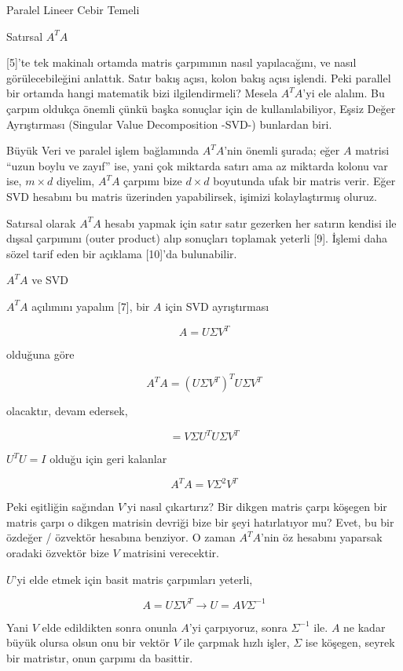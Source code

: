 \documentclass[12pt,fleqn]{article}\usepackage{../../common}
\begin{document}
Paralel Lineer Cebir Temeli

Satırsal $A^TA$

[5]'te tek makinalı ortamda matris çarpımının nasıl yapılacağını, ve nasıl
görülecebileğini anlattık. Satır bakış açısı, kolon bakış açısı işlendi. Peki
parallel bir ortamda hangi matematik bizi ilgilendirmeli? Mesela $A^TA$'yi ele
alalım. Bu çarpım oldukça önemli çünkü başka sonuçlar için de kullanılabiliyor,
Eşsiz Değer Ayrıştırması (Singular Value Decomposition -SVD-) bunlardan biri.

Büyük Veri ve paralel işlem bağlamında $A^TA$'nin önemli şurada; eğer $A$
matrisi ``uzun boylu ve zayıf'' ise, yani çok miktarda satırı ama az miktarda
kolonu var ise, $m \times d$ diyelim, $A^TA$ çarpımı bize $d \times d$ boyutunda
ufak bir matris verir. Eğer SVD hesabını bu matris üzerinden yapabilirsek,
işimizi kolaylaştırmış oluruz. 

Satırsal olarak $A^TA$ hesabı yapmak için satır satır gezerken her satırın
kendisi ile dışsal çarpımını (outer product) alıp sonuçları toplamak yeterli
[9]. İşlemi daha sözel tarif eden bir açıklama [10]'da bulunabilir.

$A^TA$ ve SVD

$A^TA$ açılımını yapalım [7], bir $A$ için SVD ayrıştırması

$$
A = U \Sigma V^T
$$

olduğuna göre

$$
A^TA =  (U \Sigma V^T)^T  U \Sigma V^T
$$

olacaktır, devam edersek,

$$
= V \Sigma U^T U \Sigma V^T 
$$

$U^T U = I$ olduğu için geri kalanlar

$$
A^TA = V \Sigma^2 V^T 
$$

Peki eşitliğin sağından $V$'yi nasıl çıkartırız? Bir dikgen matris çarpı köşegen
bir matris çarpı o dikgen matrisin devriği bize bir şeyi hatırlatıyor mu?  Evet,
bu bir özdeğer / özvektör hesabına benziyor. O zaman $A^TA$'nin öz hesabını
yaparsak oradaki özvektör bize $V$ matrisini verecektir. 

$U$'yi elde etmek için basit matris çarpımları yeterli,

$$
A = U \Sigma V^T \to U = A V \Sigma^{-1}
$$

Yani $V$ elde edildikten sonra onunla $A$'yi çarpıyoruz, sonra $\Sigma^{-1}$
ile. $A$ ne kadar büyük olursa olsun onu bir vektör $V$ ile çarpmak hızlı
işler, $\Sigma$ ise köşegen, seyrek bir matristır, onun çarpımı da basittir.
\end{document}
